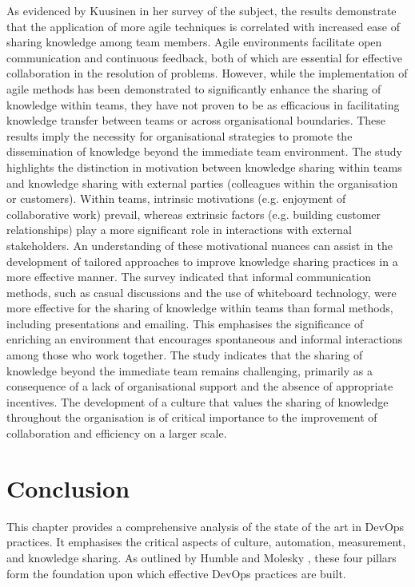 As evidenced by Kuusinen \cite{Kuusinen2017} in her survey of the subject, the results demonstrate that the application of more agile techniques is correlated with increased ease of sharing knowledge among team members. Agile environments facilitate open communication and continuous feedback, both of which are essential for effective collaboration in the resolution of problems. However, while the implementation of agile methods has been demonstrated to significantly enhance the sharing of knowledge within teams, they have not proven to be as efficacious in facilitating knowledge transfer between teams or across organisational boundaries. These results imply the necessity for organisational strategies to promote the dissemination of knowledge beyond the immediate team environment. The study highlights the distinction in motivation between knowledge sharing within teams and knowledge sharing with external parties (colleagues within the organisation or customers). Within teams, intrinsic motivations (e.g. enjoyment of collaborative work) prevail, whereas extrinsic factors (e.g. building customer relationships) play a more significant role in interactions with external stakeholders. An understanding of these motivational nuances can assist in the development of tailored approaches to improve knowledge sharing practices in a more effective manner. The survey indicated that informal communication methods, such as casual discussions and the use of whiteboard technology, were more effective for the sharing of knowledge within teams than formal methods, including presentations and emailing. This emphasises the significance of enriching an environment that encourages spontaneous and informal interactions among those who work together. The study indicates that the sharing of knowledge beyond the immediate team remains challenging, primarily as a consequence of a lack of organisational support and the absence of appropriate incentives. The development of a culture that values the sharing of knowledge throughout the organisation is of critical importance to the improvement of collaboration and efficiency on a larger scale.


\section{Conclusion}

This chapter provides a comprehensive analysis of the state of the art in \ac{DevOps} practices. It emphasises the critical aspects of culture, automation, measurement, and knowledge sharing. As outlined by Humble and Molesky \cite{HumbleMolesky2011}, these four pillars form the foundation upon which effective \ac{DevOps} practices are built.

